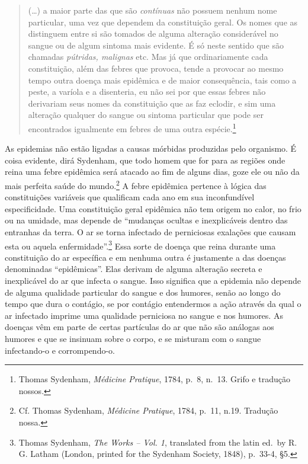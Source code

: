 \begin{quote}
(\ldots{}) a maior parte das que são \emph{contínuas} não possuem nenhum
nome particular, uma vez que dependem da constituição geral. Os nomes
que as distinguem entre si são tomados de alguma alteração considerável
no sangue ou de algum sintoma mais evidente. É só neste sentido que são
chamadas \emph{pútridas, malignas} etc. Mas já que ordinariamente cada
constituição, além das febres que provoca, tende a provocar ao mesmo
tempo outra doença mais epidêmica e de maior consequência, tais como a
peste, a varíola e a disenteria, eu não sei por que essas febres não
derivariam seus nomes da constituição que as faz eclodir, e sim uma
alteração qualquer do sangue ou sintoma particular que pode ser
encontrados igualmente em febres de uma outra espécie.\footnote{Thomas
  Sydenham, \emph{Médicine Pratique}, 1784, p.~8, n.~13. Grifo e
  tradução nossos.}
\end{quote}

As epidemias não estão ligadas a causas mórbidas produzidas pelo
organismo. É coisa evidente, dirá Sydenham, que todo homem que for para
as regiões onde reina uma febre epidêmica será atacado ao fim de alguns
dias, goze ele ou não da mais perfeita saúde do mundo.\footnote{Cf.
  Thomas Sydenham, \emph{Médicine Pratique}, 1784, p.~11, n.19. Tradução
  nossa.} A febre epidêmica pertence à lógica das constituições
variáveis que qualificam cada ano em sua inconfundível especificidade.
Uma constituição geral epidêmica não tem origem no calor, no frio ou na
umidade, mas depende de ``mudanças ocultas e inexplicáveis dentro das
entranhas da terra. O ar se torna infectado de perniciosas exalações que
causam esta ou aquela enfermidade''.\footnote{Thomas Sydenham, \emph{The
  Works -- Vol. 1}, translated from the latin ed.~by R. G. Latham
  (London, printed for the Sydenham Society, 1848), p.~33-4, §5.} Essa
sorte de doença que reina durante uma constituição do ar específica e em
nenhuma outra é justamente a das doenças denominadas ``epidêmicas''.
Elas derivam de alguma alteração secreta e inexplicável do ar que
infecta o sangue. Isso significa que a epidemia não depende de alguma
qualidade particular do sangue e dos humores, senão ao longo do tempo
que dura o contágio, se por contágio entendermos a ação através da qual
o ar infectado imprime uma qualidade perniciosa no sangue e nos humores.
As doenças vêm em parte de certas partículas do ar que não são análogas
aos humores e que se insinuam sobre o corpo, e se misturam com o sangue
infectando-o e corrompendo-o.

